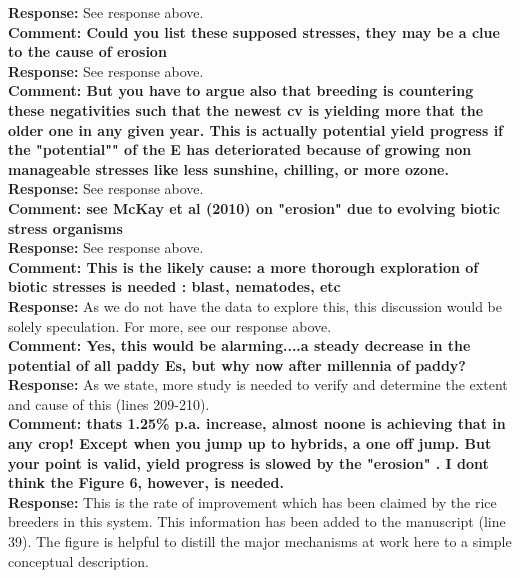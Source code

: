 \documentclass{article} \usepackage[margin=1in]{geometry}
\begin{document}
\textbf{Response: } See response above.\\

\textbf{Comment: Could you list these supposed stresses, they may be a
  clue to the cause of erosion}\\

\textbf{Response: } See response above.\\

\textbf{Comment: But you have to argue also that breeding is
  countering these negativities such that the newest cv is yielding
  more that the older one in any given year. This is actually
  potential yield progress if the "potential"" of the E has
  deteriorated because of growing non manageable stresses like less
  sunshine, chilling, or more ozone.}\\

\textbf{Response: } See response above.\\

\textbf{Comment: see McKay et al (2010) on "erosion" due to evolving
  biotic stress organisms}\\

\textbf{Response: } See response above.\\

\textbf{Comment: This is the likely cause: a more thorough exploration
  of biotic stresses is needed : blast, nematodes, etc}\\

\textbf{Response: } As we do not have the data to explore this, this
discussion would be solely speculation. For more, see our response
above.\\

\textbf{Comment: Yes, this would be alarming....a steady decrease in
  the potential of all paddy Es, but why now after millennia of
  paddy?}\\

\textbf{Response: } As we state, more study is needed to verify and
determine the extent and cause of this (lines 209-210).\\

\textbf{Comment: thats 1.25\% p.a. increase, almost noone is achieving
  that in any crop! Except when you jump up to hybrids, a one off
  jump. But your point is valid, yield progress is slowed by the
  "erosion" . I dont think the Figure 6, however, is needed.}\\

\textbf{Response: } This is the rate of improvement which has been
claimed by the rice breeders in this system. This information has been
added to the manuscript (line 39). The figure is helpful to distill
the major mechanisms at work here to a simple conceptual
description.\\
\end{document}
